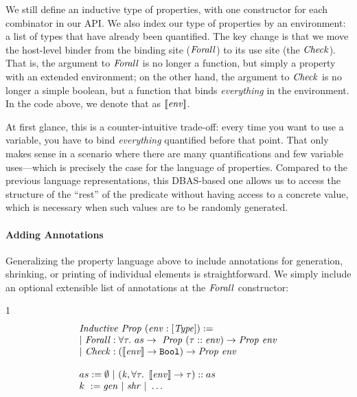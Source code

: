 \noindent
We still define an inductive type of properties, with one constructor for each combinator
in our API. We also index our type of properties by an environment: a list of types that
have already been quantified. The key change is that we move the host-level binder from
the binding site ($\mathit{Forall}$) to its use site (the $\mathit{Check}$). That is, the argument to
$\mathit{Forall}$ is no longer a function, but simply a property with an extended environment;
on the other hand, the argument to $\mathit{Check}$ is no longer a simple boolean, but a
function that binds \emph{everything} in the environment. In the code above, we denote
that as $\left[\!\left[\mathit{env}\right]\!\right]$.

At first glance, this is a counter-intuitive trade-off: every time you want to use a
variable, you have to bind \emph{everything} quantified before that point. That only
makes sense in a scenario where there are many quantifications and few variable
uses---which is precisely the case for the language of properties. Compared to the
previous language representations, this DBAS-based one allows us to access the
structure of the ``rest'' of the predicate without having access to a concrete value,
which is necessary when such values are to be randomly generated.

\paragraph*{Adding Annotations}

Generalizing the property language above to include annotations for generation,
shrinking, or printing of individual elements is straightforward. We simply include an
optional extensible list of annotations at the $\mathit{Forall}$ constructor:

\begin{spacing}{1}
  \[
    \begin{array}{l}
      \mathit{Inductive} ~ \mathit{Prop} ~ (\mathit{env} : [\mathit{Type}]) :=                                                              \\
      | ~ \mathit{Forall} : \forall \tau. ~as \rightarrow ~ \mathit{Prop} ~ (\tau :: \mathit{env}) \rightarrow \mathit{Prop} ~ \mathit{env} \\
      | ~ \mathit{Check}  : (\left[\!\left[\mathit{env}\right]\!\right] \rightarrow \mathtt{Bool}) \rightarrow \mathit{Prop} ~ \mathit{env}                        \\
      \\
      as := \emptyset ~|~ (\mathit{k}, \forall \tau. ~ \left[\!\left[\mathit{env}\right]\!\right] \rightarrow \tau) :: as              \\
      k ~ := \mathit{gen} ~|~ \mathit{shr} ~|~ \ldots                                                    \\
    \end{array}
  \]
\end{spacing}
\vspace{0.5\baselineskip}

